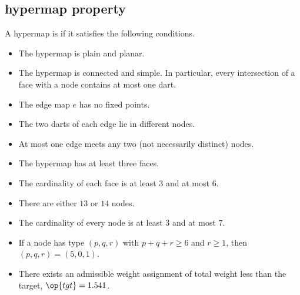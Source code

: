 \subsection{hypermap property}
\label{sec:graphproperty}

\begin{definition}[tame]
A hypermap is  if it satisfies the following conditions.
%
%
\begin{itemize}
\label{definition:tame}
\item {}  
The hypermap is plain and planar.
\item {} 
The hypermap is connected and simple.  In
  particular, every intersection of a face with a node contains at
  most one dart.
\item {} 
The edge map $e$ has no fixed points.
\item {} 
The two darts of each edge lie in different nodes.
\item {} 
At most one edge meets any two (not necessarily distinct) nodes.
\item {} 
  The hypermap has at least three faces.
\item {}
The cardinality of each face is at least $3$  and at most $6$.
\item {} 
There are either $13$ or $14$ nodes.
\item {} 
The cardinality of every node is at least $3$
  and at most $7$.
\item {} 
If a node has type $(p,q,r)$ with $p+q+r\ge 6$ and $r\ge 1$, then $(p,q,r)=(5,0,1)$. 
\item {} 
There exists an admissible weight assignment
of total weight less than the target, $\op{tgt}=1.541$.
\end{itemize}
\end{definition}
%
%
%
%
%
%
%
%

